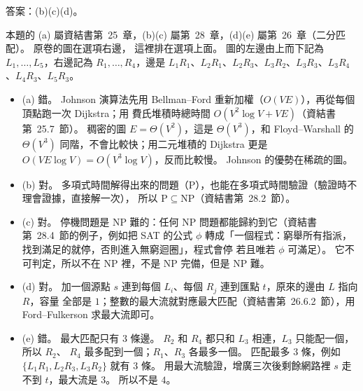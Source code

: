 \begin{pastsoln}
答案：(b)(c)(d)。

本題的 (a) 屬資結書第~25~章，(b)(c) 屬第~28~章，(d)(e) 屬第~26~章（二分匹配）。 原卷的圖在選項右邊，
這裡排在選項上面。 圖的左邊由上而下記為 $L_1, \ldots, L_5$，右邊記為 $R_1, \ldots, R_4$，邊是
$L_1R_1$、$L_2R_1$、$L_2R_3$、$L_3R_2$、$L_3R_3$、$L_3R_4$、$L_4R_3$、$L_5R_3$。

\begin{itemize}
\item (a) 錯。 Johnson 演算法先用 Bellman--Ford 重新加權（$O(VE)$），再從每個頂點跑一次 Dijkstra；用
費氏堆積時總時間 $O(V^2 \log V + VE)$（資結書第~25.7~節）。 稠密的圖 $E = \Theta(V^2)$，這是
$\Theta(V^3)$，和 Floyd--Warshall 的 $\Theta(V^3)$ 同階，不會比較快；用二元堆積的 Dijkstra 更是
$O(VE \log V) = O(V^3 \log V)$，反而比較慢。 Johnson 的優勢在稀疏的圖。
\item (b) 對。 多項式時間解得出來的問題（P），也能在多項式時間驗證（驗證時不理會證據，直接解一次），
所以 $\mathrm{P} \subseteq \mathrm{NP}$（資結書第~28.2~節）。
\item (c) 對。 停機問題是 NP 難的：任何 NP 問題都能歸約到它（資結書第~28.4~節的例子，例如把
\textsf{SAT} 的公式 $\phi$ 轉成「一個程式：窮舉所有指派，找到滿足的就停，否則進入無窮迴圈」，程式會停
若且唯若 $\phi$ 可滿足）。 它不可判定，所以不在 NP 裡，不是 NP 完備，但是 NP 難。
\item (d) 對。 加一個源點 $s$ 連到每個 $L_i$、每個 $R_j$ 連到匯點 $t$，原來的邊由 $L$ 指向 $R$，容量
全部是 $1$；整數的最大流就對應最大匹配（資結書第~26.6.2~節），用 Ford--Fulkerson 求最大流即可。
\item (e) 錯。 最大匹配只有 $3$ 條邊。 $R_2$ 和 $R_4$ 都只和 $L_3$ 相連，$L_3$ 只能配一個，所以 $R_2$、
$R_4$ 最多配到一個；$R_1$、$R_3$ 各最多一個。 匹配最多 $3$ 條，例如 $\{L_1R_1, L_2R_3, L_3R_2\}$
就有 $3$ 條。 用最大流驗證，增廣三次後剩餘網路裡 $s$ 走不到 $t$，最大流是 $3$。 所以不是 $4$。
\end{itemize}
\end{pastsoln}
